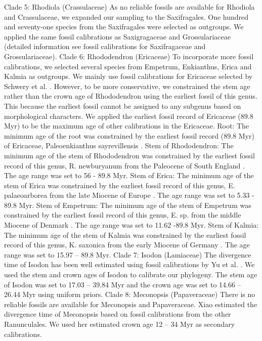 \documentclass[10pt]{article}
\begin{document}
Clade 5: Rhodiola (Crassulaceae) 
As no reliable fossils are available for Rhodiola and Crassulaceae, we expanded our sampling to the Saxifragales. One hundred and seventy-one species from the Saxifragales were selected as outgroups. We applied the same fossil calibrations as Saxigragaceae and Grossulariaceae (detailed information see fossil calibrations for Saxifragaceae and Grossulariaceae).
Clade 6: Rhododendron (Ericaceae)
To incorporate more fossil calibrations, we selected several species from Empetrum, Enkianthus, Erica and Kalmia as outgroups.  We mainly use fossil calibrations for Ericaceae selected by Schwery et al. \citep{Schwery, Onstein et al. 2015}. However, to be more conservative, we constrained the stem age rather than the crown age of Rhododendron using the earliest fossil of this genus. This because the earliest fossil cannot be assigned to any subgenus based on morphological characters. We applied the earliest fossil record of Ericaceae (89.8 Myr) to be the maximum age of other calibrations in the Ericaceae.
Root: The minimum age of the root was constrained by the earliest fossil record (89.8 Myr) of Ericaceae, Paleoenkianthus sayrevillensis \citep{Nixon and Crepet 1993}. 
Stem of Rhododendron: The minimum age of the stem of Rhododendron was constrained by the earliest fossil record of this genus, R. newburyanum from the Paleocene of South England \citep{Collinson and Crane 1978}. The age range was set to 56 - 89.8 Myr.
Stem of Erica: The minimum age of the stem of Erica was constrained by the earliest fossil record of this genus, E. palaeoarborea from the late Miocene of Europe \citep{Van der Burgh 1987}. The age range was set to 5.33 - 89.8 Myr. 
Stem of Empetrum: The minimum age of the stem of Empetrum was constrained by the earliest fossil record of this genus, E. sp. from the middle Miocene of Denmark \citep{Friis 1979}. The age range was set to 11.62 -89.8 Myr. 
Stem of Kalmia: The minimum age of the stem of Kalmia was constrained by the earliest fossil record of this genus, K. saxonica from the early Miocene of Germany \citep{Van der Burgh 1987}. The age range was set to 15.97 – 89.8 Myr.
Clade 7: Isodon (Lamiaceae)
The divergence time of Isodon has been well estimated using fossil calibrations by Yu et al. \citep{Yu, Maki et al. 2014}. We used the stem and crown ages of Isodon to calibrate our phylogeny. The stem age of Isodon was set to 17.03 – 39.84 Myr and the crown age was set to 14.66 – 26.44 Myr \citep{Yu, Maki et al. 2014} using uniform priors.
Clade 8: Meconopsis (Papaveraceae)
There is no reliable fossils are available for Meconopsis and Papaveraceae. Xiao \citep{Xiao 2013} estimated the divergence time of Meconopsis based on fossil calibrations from the other Ranunculales. We used her estimated crown age 12 – 34 Myr as secondary calibrations. 
\end{document}
